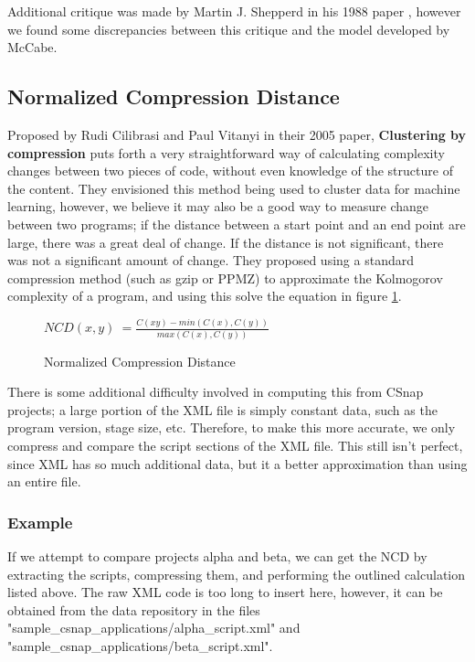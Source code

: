 \documentclass[]{article}
\begin{document}
Additional critique was made by Martin J. Shepperd in his 1988 paper \cite{shepperd1988critique}, however we found some discrepancies between this critique and the model developed by McCabe.

\subsection{Normalized Compression Distance}

Proposed by Rudi Cilibrasi and Paul Vitanyi in their 2005 paper, \textbf{Clustering by compression} \cite{ref:cilibrasi2005clustering} puts forth a very straightforward way of calculating complexity changes between two pieces of code, without even knowledge of the structure of the content.
They envisioned this method being used to cluster data for machine learning, however, we believe it may also be a good way to measure change between two programs; if the distance between a start point and an end point are large, there was a great deal of change.
If the distance is not significant, there was not a significant amount of change.
They proposed using a standard compression method (such as gzip or PPMZ) to approximate the Kolmogorov complexity of a program, and using this solve the equation in figure \ref{ncd_eq_1}.


\begin{figure}[h]
	\caption{Normalized Compression Distance}
	\label{ncd_eq_1}
	\centering
	$NCD(x,y) ~= \frac{C(xy) - min(C(x),C(y))}{max(C(x),C(y))}$
\end{figure}

There is some additional difficulty involved in computing this from CSnap projects; a large portion of the XML file is simply constant data, such as the program version, stage size, etc.
Therefore, to make this more accurate, we only compress and compare the script sections of the XML file.
This still isn't perfect, since XML has so much additional data, but it a better approximation than using an entire file.

\subsubsection{Example}

If we attempt to compare projects alpha and beta, we can get the NCD by extracting the scripts, compressing them, and performing the outlined calculation listed above.
The raw XML code is too long to insert here, however, it can be obtained from the data repository in the files "sample\_csnap\_applications/alpha\_script.xml" and "sample\_csnap\_applications/beta\_script.xml".
\end{document}

